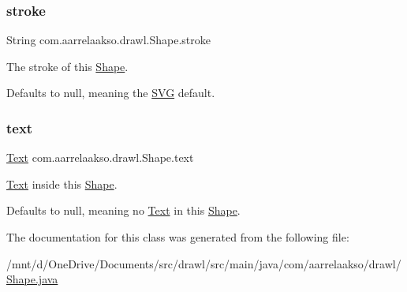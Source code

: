 \subsubsection{\texorpdfstring{stroke}{stroke}}
{\footnotesize\ttfamily String com.\+aarrelaakso.\+drawl.\+Shape.\+stroke\hspace{0.3cm}{\ttfamily [private]}}



The stroke of this \hyperlink{classcom_1_1aarrelaakso_1_1drawl_1_1_shape}{Shape}. 

Defaults to null, meaning the \hyperlink{classcom_1_1aarrelaakso_1_1drawl_1_1_s_v_g}{S\+VG} default. \mbox{\label{classcom_1_1aarrelaakso_1_1drawl_1_1_shape_ab54afc2d95d3447532f5ecf3fec3faa8}} 
\subsubsection{\texorpdfstring{text}{text}}
{\footnotesize\ttfamily \hyperlink{classcom_1_1aarrelaakso_1_1drawl_1_1_text}{Text} com.\+aarrelaakso.\+drawl.\+Shape.\+text\hspace{0.3cm}{\ttfamily [private]}}



\hyperlink{classcom_1_1aarrelaakso_1_1drawl_1_1_text}{Text} inside this \hyperlink{classcom_1_1aarrelaakso_1_1drawl_1_1_shape}{Shape}. 

Defaults to null, meaning no \hyperlink{classcom_1_1aarrelaakso_1_1drawl_1_1_text}{Text} in this \hyperlink{classcom_1_1aarrelaakso_1_1drawl_1_1_shape}{Shape}. 

The documentation for this class was generated from the following file\+:\begin{DoxyCompactItemize}
\item 
/mnt/d/\+One\+Drive/\+Documents/src/drawl/src/main/java/com/aarrelaakso/drawl/\hyperlink{_shape_8java}{Shape.\+java}\end{DoxyCompactItemize}
